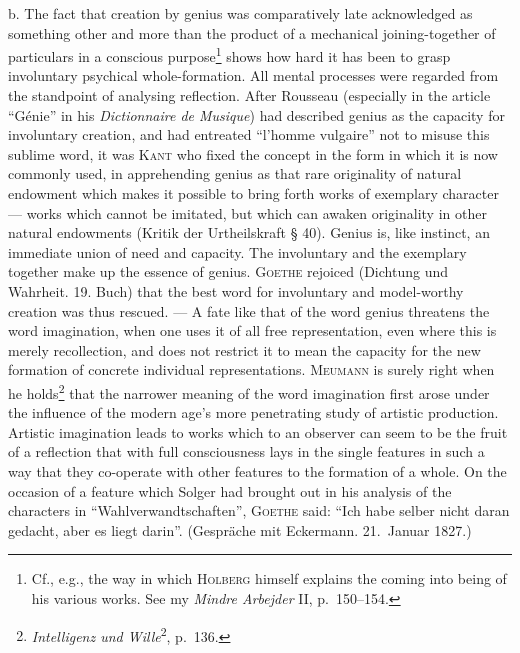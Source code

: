 \documentclass[12pt]{book}
\newcommand{\opage}[1]{\marginnote{\footnotesize\textit{[#1]}}}
\begin{document}
b. The fact that creation by genius was comparatively late acknowledged as
something other and more than the product of a mechanical joining-together of
particulars in a conscious purpose\footnote{Cf., e.g., the way in which
\textsc{Holberg} himself explains the coming into being of his various works.
See my \textit{Mindre Arbejder} II, p.\ 150--154.} shows how hard it has been to
grasp involuntary psychical whole-formation. All mental processes were regarded
from the \opage{29}standpoint of analysing reflection. After Rousseau (especially in the
article ``Génie'' in his \textit{Dictionnaire de Musique}) had described genius
as the capacity for involuntary creation, and had entreated ``l'homme vulgaire''
not to misuse this sublime word, it was \textsc{Kant} who fixed the concept in
the form in which it is now commonly used, in apprehending genius as that rare
originality of natural endowment which makes it possible to bring forth works of
exemplary character --- works which cannot be imitated, but which can awaken
originality in other natural endowments (Kritik der Urtheilskraft § 40). Genius
is, like instinct, an immediate union of need and capacity. The involuntary and
the exemplary together make up the essence of genius. \textsc{Goethe} rejoiced
(Dichtung und Wahrheit. 19. Buch) that the best word for involuntary and
model-worthy creation was thus rescued. --- A fate like that of the word genius
threatens the word imagination, when one uses it of all free representation,
even where this is merely recollection, and does not restrict it to mean the
capacity for the new formation of concrete individual representations.
\textsc{Meumann} is surely right when he holds\footnote{\textit{Intelligenz und
Wille}\textsuperscript{2}, p.\ 136.} that the narrower meaning of the word
imagination first arose under the influence of the modern age's more penetrating
study of artistic production. Artistic imagination leads to works which to an
observer can seem to be the fruit of a reflection that with full consciousness
lays in the single features in such a way that they co-operate with other
features to the formation of a whole. On the occasion of a feature which Solger
had brought out in his analysis of the characters in
``Wahlverwandtschaften'', \textsc{Goethe} said: ``Ich habe selber nicht daran
gedacht, aber es liegt darin''. (Gespräche mit Eckermann. 21.\ Januar 1827.)
\end{document}
